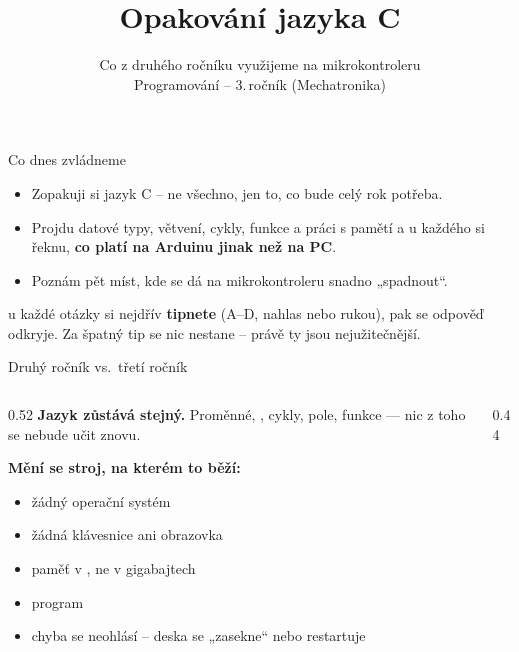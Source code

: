 \documentclass[12pt,aspectratio=169]{beamer}
\title{Opakování jazyka C}
\subtitle{Co z druhého ročníku využijeme na mikrokontroleru \\ Programování -- 3.\,ročník (Mechatronika)}
\begin{document}
\maketitle

\begin{keyframe}{Co dnes zvládneme}
  \begin{itemize}
    \item Zopakuji si jazyk C  -- ne všechno, jen to,
          co bude celý rok potřeba.
    \item Projdu datové typy, větvení, cykly, funkce a práci s pamětí a u každého
          si řeknu, \textbf{co platí na Arduinu jinak než na PC}.
    \item Poznám pět míst, kde se dá na mikrokontroleru snadno „spadnout``.
  \end{itemize}
  \vfill
   u každé otázky si nejdřív \textbf{tipnete} (A--D, nahlas nebo
  rukou), pak se odpověď odkryje. Za špatný tip se nic nestane -- právě ty jsou
  nejužitečnější.
\end{keyframe}

\begin{frame}{Druhý ročník vs.\ třetí ročník}
  \begin{columns}[T]
    \begin{column}{0.52\textwidth}
      \textbf{Jazyk zůstává stejný.} Proměnné, , cykly, pole, funkce --- nic
      z toho se nebude učit znovu.

      \vspace{3mm}
      \textbf{Mění se stroj, na kterém to běží:}
      \begin{itemize}
        \item žádný operační systém
        \item žádná klávesnice ani obrazovka
        \item paměť v , ne v gigabajtech
        \item program 
        \item chyba se neohlásí -- deska se „zasekne`` nebo restartuje
      \end{itemize}
    \end{column}
    \begin{column}{0.44\textwidth}
    \end{column}
  \end{columns}
\end{frame}
\end{document}
